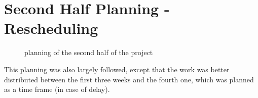\documentclass[a4paper,11pt]{report}
\begin{document}
\section{Second Half Planning - Rescheduling}
\begin{figure}[H]
\vspace{-5pt}
\begin{center}
\vspace{-5pt}
\caption{planning of the second half of the project}
\end{center}
\end{figure}
\vspace{-10pt}

This planning was also largely followed, except that the work was better distributed between the first three weeks and the fourth one, which was planned as a time frame (in case of delay).
\end{document}
